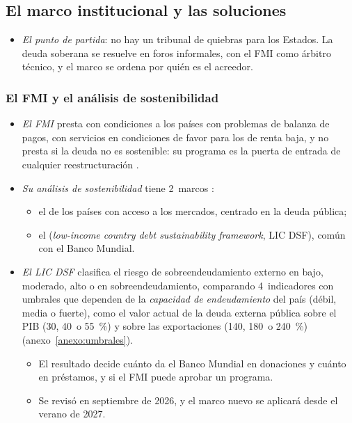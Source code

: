 \documentclass[11pt]{article}
\begin{document}
\subsection{El marco institucional y las soluciones}\label{sec:marco-deuda}

\begin{itemize}
\item \emph{El punto de partida}: no hay un tribunal de quiebras para los Estados. La deuda soberana se resuelve en foros informales, con el FMI como árbitro técnico, y el marco se ordena por quién es el acreedor.
\end{itemize}

\subsubsection{El FMI y el análisis de sostenibilidad}\label{sec:dsa}

\begin{itemize}
\item \emph{El FMI} presta con condiciones a los países con problemas de balanza de pagos, con servicios en condiciones de favor para los de renta baja, y no presta si la deuda no es sostenible: su programa es la puerta de entrada de cualquier reestructuración .
\item \emph{Su análisis de sostenibilidad} tiene 2~marcos :
  \begin{itemize}
  \item el de los países con acceso a los mercados, centrado en la deuda pública;
  \item el  (\emph{low-income country debt sustainability framework}, LIC DSF), común con el Banco Mundial.
  \end{itemize}
\item \emph{El LIC DSF} clasifica el riesgo de sobreendeudamiento externo en bajo, moderado, alto o en sobreendeudamiento, comparando 4~indicadores con umbrales que dependen de la \emph{capacidad de endeudamiento} del país (débil, media o fuerte), como el valor actual de la deuda externa pública sobre el PIB (30, 40~o 55~\%) y sobre las exportaciones (140, 180~o 240~\%)\nocite{FMI2018LICDSF} (anexo~\ref{anexo:umbrales}).
  \begin{itemize}
  \item El resultado decide cuánto da el Banco Mundial en donaciones y cuánto en préstamos, y si el FMI puede aprobar un programa.
  \item Se revisó en septiembre de 2026, y el marco nuevo se aplicará desde el verano de 2027\nocite{FMI2026LICDSF}.
  \end{itemize}
\end{itemize}
\end{document}
